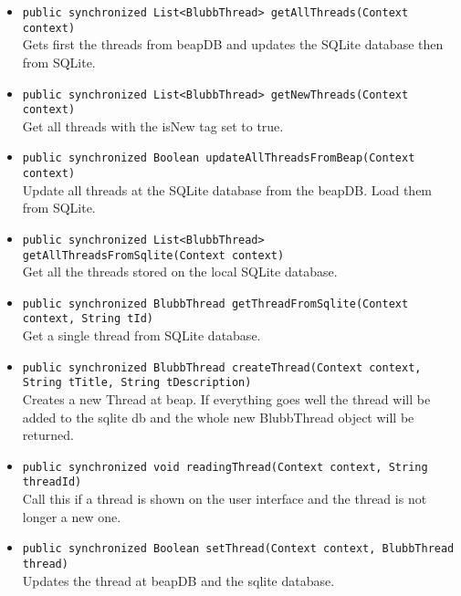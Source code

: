 \documentclass[12pt,a4paper,oneside]{report}
\newcommand{\code}[1]{\lstinline{#1}}
\begin{document}
\begin{itemize}
\item{\code{public synchronized List<BlubbThread> getAllThreads(Context context)}}\\
Gets first the threads from beapDB and updates the SQLite database then from SQLite.

\item{\code{public synchronized List<BlubbThread> getNewThreads(Context context)}}\\
Get all threads with the isNew tag set to true.
 
\item{\code{public synchronized Boolean updateAllThreadsFromBeap(Context context)}}\\
Update all threads at the SQLite database from the beapDB. Load them from SQLite.

\item{\code{public synchronized List<BlubbThread> getAllThreadsFromSqlite(Context context)}}\\
Get all the threads stored on the local SQLite database.

\item{\code{public synchronized BlubbThread getThreadFromSqlite(Context context, String tId)}}\\
Get a single thread from SQLite database.

\item{\code{public synchronized BlubbThread createThread(Context context, String tTitle, String tDescription)}}\\
Creates a new Thread at beap. If everything goes well the thread will be added to the sqlite db and the whole new BlubbThread object will be returned.

\item{\code{public synchronized void readingThread(Context context, String threadId)}}\\
Call this if a thread is shown on the user interface and the thread is not longer a new one.

\item{\code{public synchronized Boolean setThread(Context context, BlubbThread thread)}}\\
Updates the thread at beapDB and the sqlite database.

\end{itemize}
\end{document}
